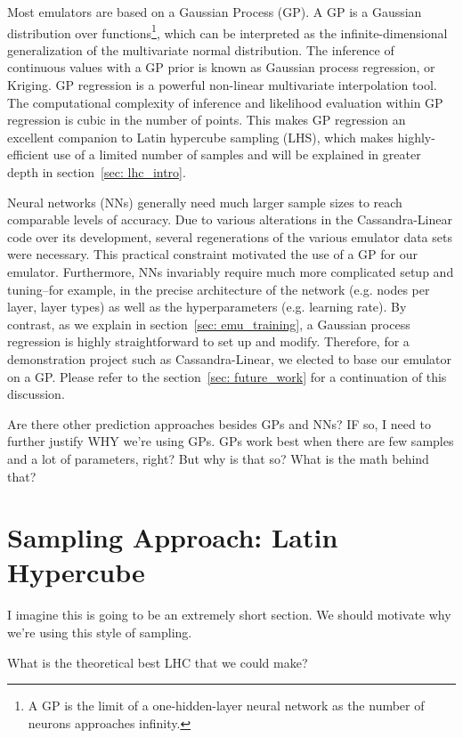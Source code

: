 
Most emulators are based on a Gaussian Process (GP). A GP is a Gaussian
distribution over functions\footnote
{A GP is the limit of a one-hidden-layer neural network as the number of
neurons approaches infinity.}, which can be interpreted
as the infinite-dimensional generalization of the multivariate normal
distribution. The inference of continuous values with a GP prior
is known as Gaussian process regression, or Kriging. GP regression is a
powerful non-linear multivariate interpolation tool. The computational
complexity of inference and likelihood evaluation within GP regression is cubic
in the number of points. This makes GP regression an excellent companion to
Latin hypercube sampling (LHS), which makes highly-efficient use of a limited 
number of samples and will be explained in greater depth in section~\ref{sec:
lhc_intro}.

Neural networks (NNs) generally need much larger sample sizes to reach
comparable levels of
accuracy. Due to various alterations in the Cassandra-Linear code over its
development, several regenerations of the various emulator data sets were
necessary. This practical constraint motivated the use of a GP for our
emulator. Furthermore, NNs invariably require much more complicated setup and
tuning--for example, in the precise architecture of the network (e.g. nodes
per layer, layer types) as well as the hyperparameters (e.g. learning rate).
By contrast, as we explain in section~\ref{sec: emu_training}, a Gaussian
process regression is highly straightforward to set up and modify. Therefore,
for a demonstration project such as Cassandra-Linear, we elected to base our
emulator on a GP. Please refer to the section~\ref{sec: future_work} for a
continuation of this discussion.

Are there other prediction approaches besides GPs and NNs? IF so, I need to
further justify WHY we’re using GPs.
GPs work best when there are few samples and a lot of parameters, right?
But why is that so? What is the math behind that?


\section{Sampling Approach: Latin Hypercube}
\label{sec: lhc_theory}

I imagine this is going to be an extremely short section. We should motivate why we're using this style of sampling.

What is the theoretical best LHC that we could make?

